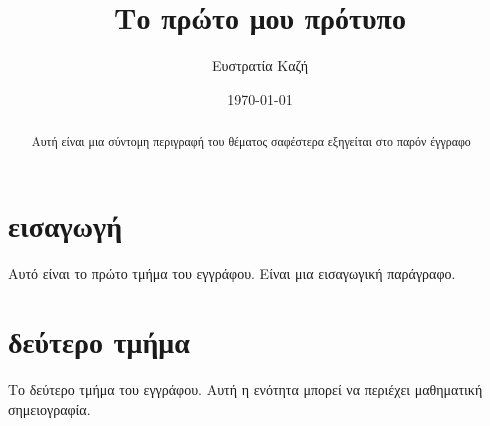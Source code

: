 \documentclass[10pt,a4paper]{article}
\author{Ευστρατία Καζή}
\title{Το πρώτο μου πρότυπο}
\date{\today}
\begin{document}
\begin{titlepage}
\maketitle
\end{titlepage}

\tableofcontents

\begin{abstract}
Αυτή είναι μια σύντομη περιγραφή του θέματος 
σαφέστερα εξηγείται στο παρόν έγγραφο
\end{abstract}

\section{εισαγωγή}
Αυτό είναι το πρώτο τμήμα του εγγράφου. 
Είναι μια εισαγωγική παράγραφο.

\section{δεύτερο τμήμα}
Το δεύτερο τμήμα του εγγράφου. Αυτή η ενότητα 
μπορεί να περιέχει μαθηματική σημειογραφία.
\end{document}
